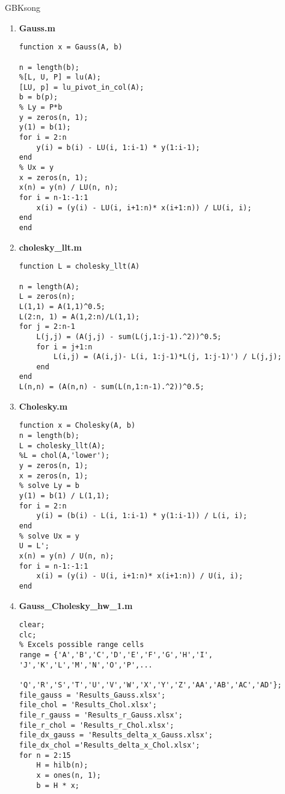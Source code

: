 \documentclass[a4paper]{article}
\begin{document}
\begin{CJK*}{GBK}{song}
\begin{enumerate}[(1)]
\begin{lstlisting}
        % Exchange the two rows of the matrix
        tmp = LU(j,:);
        LU(j, :) = LU(index, :);
        LU(index,:) = tmp;
    end
    if j == n
        break;
    end

    LU(j+1:n, j) = LU(j+1:n, j) / LU(j, j);
    for k = j+1:n
        LU(k, j+1:n) = LU(k, j+1:n) - LU(k, j) * LU(j,j+1:n);
    end
    %LU(j+1:n, j+1:n) = LU(j+1:n, j+1:n) - LU(j+1:n, j) * LU(j,j+1:n);
end
\end{lstlisting}



\item \textbf{Gauss.m} \\
\begin{lstlisting}
function x = Gauss(A, b)

n = length(b);
%[L, U, P] = lu(A);
[LU, p] = lu_pivot_in_col(A);
b = b(p);
% Ly = P*b
y = zeros(n, 1);
y(1) = b(1);
for i = 2:n
    y(i) = b(i) - LU(i, 1:i-1) * y(1:i-1);
end
% Ux = y
x = zeros(n, 1);
x(n) = y(n) / LU(n, n);
for i = n-1:-1:1
    x(i) = (y(i) - LU(i, i+1:n)* x(i+1:n)) / LU(i, i);
end
end
\end{lstlisting}



\item \textbf{cholesky\_llt.m} \\
\begin{lstlisting}
function L = cholesky_llt(A)

n = length(A);
L = zeros(n);
L(1,1) = A(1,1)^0.5;
L(2:n, 1) = A(1,2:n)/L(1,1);
for j = 2:n-1
    L(j,j) = (A(j,j) - sum(L(j,1:j-1).^2))^0.5;
    for i = j+1:n
        L(i,j) = (A(i,j)- L(i, 1:j-1)*L(j, 1:j-1)') / L(j,j);
    end
end
L(n,n) = (A(n,n) - sum(L(n,1:n-1).^2))^0.5;
\end{lstlisting}




\item \textbf{Cholesky.m} \\
\begin{lstlisting}
function x = Cholesky(A, b)
n = length(b);
L = cholesky_llt(A);
%L = chol(A,'lower');
y = zeros(n, 1);
x = zeros(n, 1);
% solve Ly = b
y(1) = b(1) / L(1,1);
for i = 2:n
    y(i) = (b(i) - L(i, 1:i-1) * y(1:i-1)) / L(i, i);
end
% solve Ux = y
U = L';
x(n) = y(n) / U(n, n);
for i = n-1:-1:1
    x(i) = (y(i) - U(i, i+1:n)* x(i+1:n)) / U(i, i);
end
\end{lstlisting}



\item \textbf{Gauss\_Cholesky\_hw\_1.m} \\
\begin{lstlisting}
clear;
clc;
% Excels possible range cells
range = {'A','B','C','D','E','F','G','H','I', 'J','K','L','M','N','O','P',...
          'Q','R','S','T','U','V','W','X','Y','Z','AA','AB','AC','AD'};
file_gauss = 'Results_Gauss.xlsx';
file_chol = 'Results_Chol.xlsx';
file_r_gauss = 'Results_r_Gauss.xlsx';
file_r_chol = 'Results_r_Chol.xlsx';
file_dx_gauss = 'Results_delta_x_Gauss.xlsx';
file_dx_chol ='Results_delta_x_Chol.xlsx';
for n = 2:15
    H = hilb(n);
    x = ones(n, 1);
    b = H * x;


\end{lstlisting}
\end{enumerate}
\end{CJK*}
\end{document}
